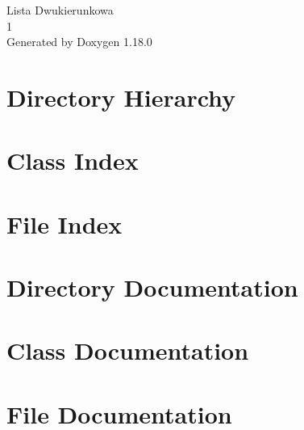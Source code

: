 \documentclass[twoside]{book}
\newcommand{\+}{\discretionary{\mbox{\scriptsize$\hookleftarrow$}}{}{}}
\newcommand{\clearemptydoublepage}{%
    \newpage{\pagestyle{empty}\cleardoublepage}%
  }
\begin{document}
  \raggedbottom
    \hypersetup{pageanchor=false,
                bookmarksnumbered=true,
                pdfencoding=unicode
               }
  \begin{titlepage}
  \vspace*{7cm}
  \begin{center}%
  {\Large Lista Dwukierunkowa}\\
  [1ex]\large 1 \\
  \vspace*{1cm}
  {\large Generated by Doxygen 1.18.0}\\
  \end{center}
  \end{titlepage}
  \clearemptydoublepage
  \tableofcontents
  \clearemptydoublepage
  \hypersetup{pageanchor=true}
\chapter{Directory Hierarchy}

\chapter{Class Index}

\chapter{File Index}

\chapter{Directory Documentation}

\chapter{Class Documentation}




\chapter{File Documentation}





  \backmatter
  \newpage
  \clearemptydoublepage
  \printindex
\end{document}
